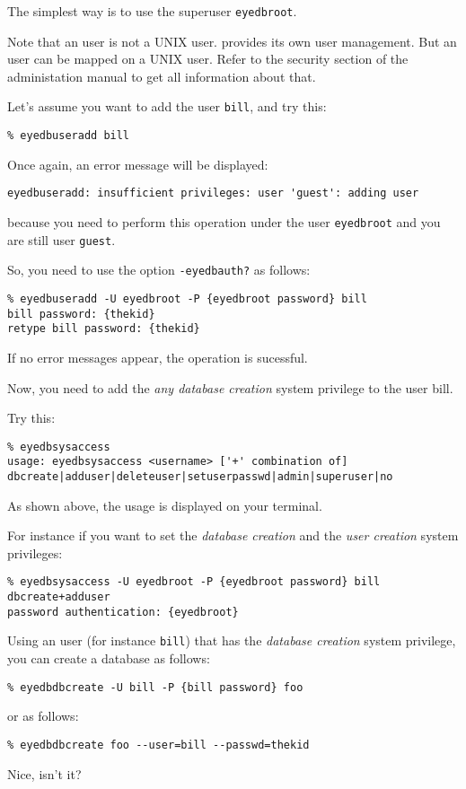 The simplest way is to use the \eyedb superuser \texttt{eyedbroot}.

Note that an \eyedb user is not a UNIX user. \eyedb provides its own
user management. But an \eyedb user can be mapped on a UNIX user.
Refer to the security section of the administation manual to get
all information about that.


Let's assume you want to add the user \texttt{bill}, and try this:
\verbsize \begin{verbatim}
% eyedbuseradd bill
\end{verbatim}
\normalsize
Once again, an error message will be displayed:
\verbsize \begin{verbatim}
eyedbuseradd: insufficient privileges: user 'guest': adding user
\end{verbatim}
\normalsize
because you need to perform this operation under the user \texttt{eyedbroot}
and you are still user \texttt{guest}.

So, you need to use the option \texttt{-eyedbauth?} as follows:
\verbsize \begin{verbatim}
% eyedbuseradd -U eyedbroot -P {eyedbroot password} bill
bill password: {thekid}
retype bill password: {thekid}
\end{verbatim}
\normalsize
If no error messages appear, the operation is sucessful.


Now, you need to add the \emph{any database creation} system privilege
to the user bill.

Try this:
\verbsize \begin{verbatim}
% eyedbsysaccess
usage: eyedbsysaccess <username> ['+' combination of] dbcreate|adduser|deleteuser|setuserpasswd|admin|superuser|no
\end{verbatim}
\normalsize
As shown above, the usage is displayed on your terminal.

For instance if you want to set the \emph{database creation} and the
\emph{user creation} system privileges:
\verbsize \begin{verbatim}
% eyedbsysaccess -U eyedbroot -P {eyedbroot password} bill dbcreate+adduser 
password authentication: {eyedbroot}
\end{verbatim}
\normalsize
{}
Using an \eyedb user (for instance \texttt{bill}) that has the \emph{database
creation} system privilege, you can create a database as follows:
\verbsize \begin{verbatim}
% eyedbdbcreate -U bill -P {bill password} foo
\end{verbatim}
\normalsize
or as follows:
\verbsize \begin{verbatim}
% eyedbdbcreate foo --user=bill --passwd=thekid
\end{verbatim}
\normalsize
Nice, isn't it?


